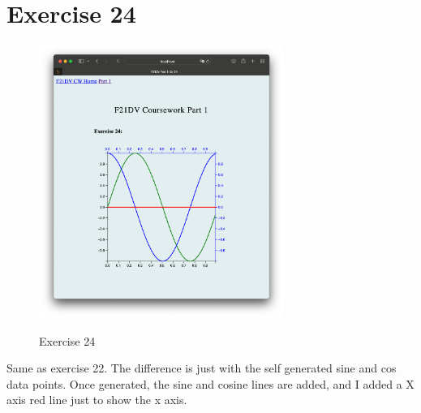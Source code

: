 \documentclass{scrreprt}
\begin{document}
\newpage
\section{Exercise 24}
\begin{figure}[!ht]
    \centering
    \includegraphics[width = 8cm]{images/ex24.png}
    \label{fig:ex24}
    \caption{Exercise 24}
\end{figure}
\FloatBarrier

Same as exercise 22. The difference is just with the self generated sine and cos data points. Once 
generated, the sine and cosine lines are added, and I added a X axis red line just to  show the x axis. 

\newpage
\end{document}
